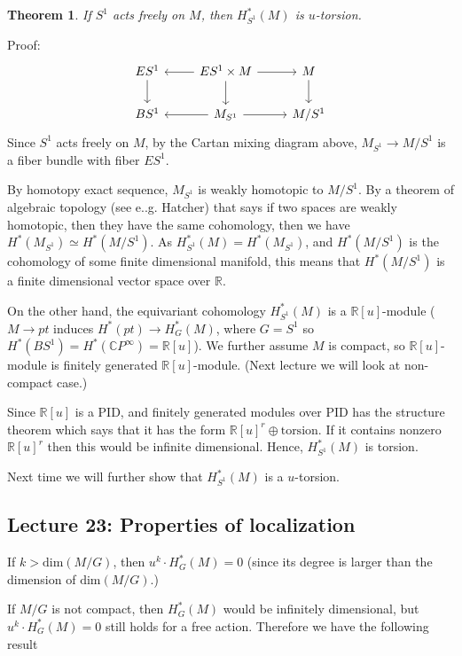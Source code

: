 \documentclass{article}
\theoremstyle{mystyle}
\newtheorem{theorem}{Theorem}%
\theoremstyle{remark}
\numberwithin{equation}{section}
\begin{document}
\begin{theorem} 
If $S^1$ acts freely on $M$, then $H^*_{S^1}(M)$ is $u$-torsion.
\end{theorem}

Proof:
$$
\begin{tikzcd} ES^1 \ar[d] & ES^1\times M \ar[l] \ar[r]\ar[d] & M  \ar[d]\\
BS^1 & \ar[l] M_{S^1} \ar[r] & M/{S^1}
\end{tikzcd}
$$
Since $S^1$ acts freely on $M$, by the Cartan mixing diagram above, $M_{S^1}\rightarrow M/{S^1}$ is a fiber bundle with fiber $ES^1$.

By homotopy exact sequence, $M_{S^1}$ is weakly homotopic to $M/{S^1}$. By a theorem of algebraic topology (see e..g. Hatcher) that says if two spaces are weakly homotopic, then they have the same cohomology, then we have $H^*(M_{S^1}) \simeq H^*(M/{S^1})$. As $H^*_{S^1}(M) = H^*(M_{S^1})$, and $H^*(M/{S^1})$ is the cohomology of some finite dimensional manifold, this means that $H^*(M/{S^1})$ is a finite dimensional vector space over $\mathbb{R}$. 

On the other hand, the equivariant cohomology $H^*_{S^1}(M)$ is a $\mathbb{R}[u]$-module ($M\rightarrow pt$ induces $H^*(pt)\rightarrow H^*_G(M)$, where $G=S^1$ so $H^*(BS^1) = H^*(\mathbb{C}P^\infty) = \mathbb{R}[u]$). We further assume $M$ is compact, so $\mathbb{R}[u]$-module is finitely generated $\mathbb{R}[u]$-module. (Next lecture we will look at non-compact case.)


Since $\mathbb{R}[u]$ is a PID, and finitely generated modules over PID has the structure theorem which says that it has the form $\mathbb{R}[u]^r \oplus \text{torsion}$. If it contains nonzero $\mathbb{R}[u]^r$ then this would be infinite dimensional. Hence,  $H^*_{S^1}(M)$ is torsion.

Next time we will further show that $H^*_{S^1}(M)$ is a $u$-torsion.




\subsection{Lecture 23: Properties of localization}

If $k>\mathrm{dim}(M/G)$, then $u^k \cdot H^*_G(M)=0$ (since its degree is larger than the dimension of $\mathrm{dim}(M/G)$.)

If $M/G$ is not compact, then $H^*_G(M)$ would be infinitely dimensional, but $u^k \cdot H^*_G(M)=0$ still holds for a free action. Therefore we have the following result
\end{document}
